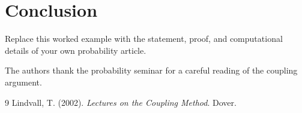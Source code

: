 \documentclass[EJP,preprint]{ejpecp}
\begin{document}
\section{Conclusion}
Replace this worked example with the statement, proof, and computational
details of your own probability article.

\begin{acks}
The authors thank the probability seminar for a careful reading of the
coupling argument.
\end{acks}

\begin{thebibliography}{9}
Lindvall, T. (2002). \emph{Lectures on the Coupling Method}. Dover.
\end{thebibliography}
\end{document}

